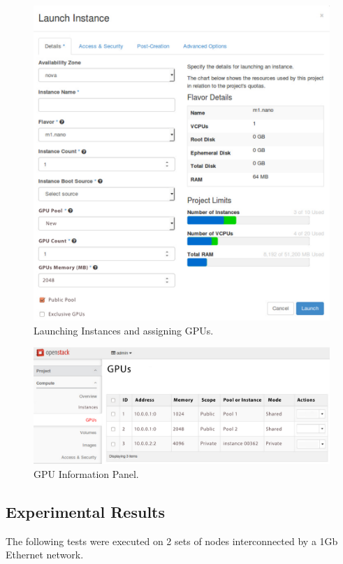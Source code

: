 \documentclass[a4paper,twoside]{article}
\begin{document}
\begin{figure}[htb]
  \centering
  \includegraphics[width=\linewidth]{images/UI-launch.pdf}
  \caption{Launching Instances and assigning GPUs.}
  \label{fig:ui-launch}
\end{figure}
  
\begin{figure}[htb]
  \centering
  \includegraphics[width=\linewidth]{images/UI-rgpus.pdf}
  \caption{GPU Information Panel.}
  \label{fig:ui-rgpus}
\end{figure}

\subsection{Experimental Results}
The following tests were executed on 2 sets of nodes interconnected by a 1Gb Ethernet network.
\end{document}
